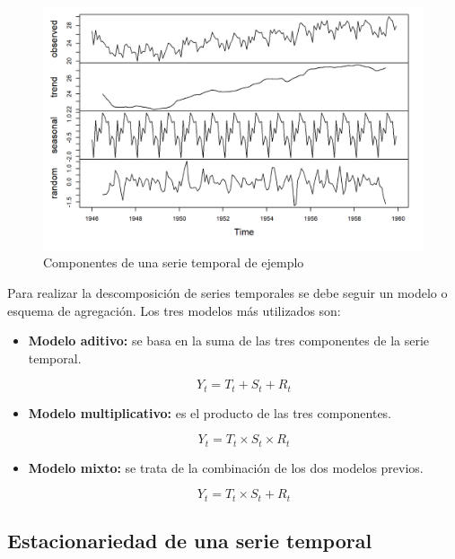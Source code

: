 \documentclass[12pt,a4paper]{report}
\begin{document}
\begin{figure}[H]
    \centering
    \includegraphics[width=1\textwidth]{Images/tfm-2.2.png}
    \caption{Componentes de una serie temporal de ejemplo \parencite[]{rojasjimenez2022}}
    \label{fig:componentesST}
\end{figure}

Para realizar la descomposición de series temporales se debe seguir un modelo o esquema de agregación. Los tres modelos más utilizados son:

\begin{itemize}
    \item \textbf{Modelo aditivo:} se basa en la suma de las tres componentes de la serie temporal.

    \begin{equation*}
        Y_t = T_t + S_t + R_t
    \end{equation*}

     \item \textbf{Modelo multiplicativo:} es el producto de las tres componentes.

     \begin{equation*}
        Y_t = T_t \times S_t \times R_t
    \end{equation*} 

    \item \textbf{Modelo mixto:} se trata de la combinación de los dos modelos previos.

     \begin{equation*}
        Y_t = T_t \times S_t + R_t
    \end{equation*}
\end{itemize}

\subsection{Estacionariedad de una serie temporal}
\end{document}
